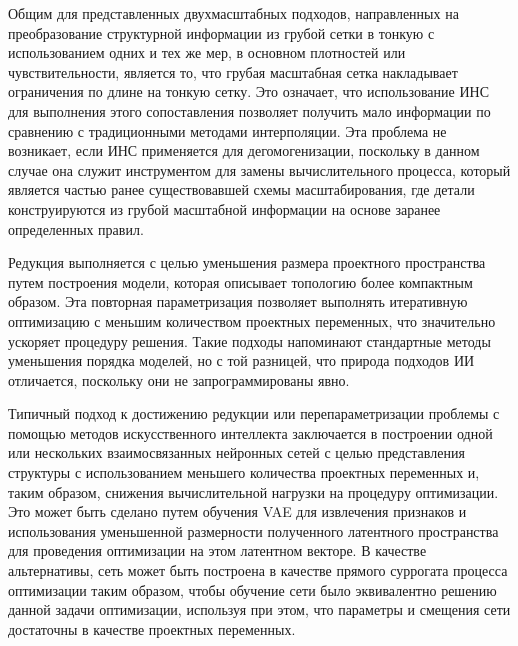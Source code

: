Общим для представленных двухмасштабных подходов, направленных на преобразование структурной информации из грубой сетки в тонкую с использованием одних и тех же мер, в основном плотностей или чувствительности, является то, что грубая масштабная сетка накладывает ограничения по длине на тонкую сетку. Это означает, что использование ИНС для выполнения этого сопоставления позволяет получить мало информации по сравнению с традиционными методами интерполяции. Эта проблема не возникает, если ИНС применяется для дегомогенизации, поскольку в данном случае она служит инструментом для замены вычислительного процесса, который является частью ранее существовавшей схемы масштабирования, где детали конструируются из грубой масштабной информации на основе заранее определенных правил.







Редукция выполняется с целью уменьшения размера проектного пространства путем построения модели, которая описывает топологию более компактным образом. Эта повторная параметризация позволяет выполнять итеративную оптимизацию с меньшим количеством проектных переменных, что значительно ускоряет процедуру решения. Такие подходы напоминают стандартные методы уменьшения порядка моделей, но с той разницей, что природа подходов ИИ отличается, поскольку они не запрограммированы явно.%

Типичный подход к достижению редукции или перепараметризации проблемы с помощью методов искусственного интеллекта заключается в построении одной или нескольких взаимосвязанных нейронных сетей с целью представления структуры с использованием меньшего количества проектных переменных и, таким образом, снижения вычислительной нагрузки на процедуру оптимизации. Это может быть сделано путем обучения VAE для извлечения признаков и использования уменьшенной размерности полученного латентного пространства для проведения оптимизации на этом латентном векторе. В качестве альтернативы, сеть может быть построена в качестве прямого суррогата процесса оптимизации таким образом, чтобы обучение сети было эквивалентно решению данной задачи оптимизации, используя при этом, что параметры и смещения сети достаточны в качестве проектных переменных.

